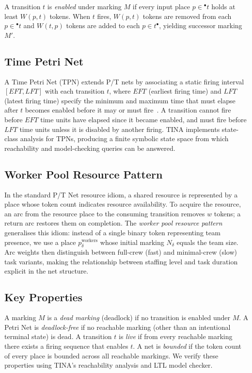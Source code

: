 \documentclass[conference,a4paper]{IEEEtran}
\begin{document}
A transition $t$ is \emph{enabled} under marking $M$ if every input place
$p \in {^\bullet}t$ holds at least $W(p,t)$ tokens. When $t$ fires,
$W(p,t)$ tokens are removed from each $p \in {^\bullet}t$ and $W(t,p)$
tokens are added to each $p \in t^{\bullet}$, yielding successor marking
$M'$.

\subsection{Time Petri Net}

A Time Petri Net (TPN) extends P/T nets by associating a static firing
interval $[\mathit{EFT}, \mathit{LFT}]$ with each transition $t$, where
$\mathit{EFT}$ (earliest firing time) and $\mathit{LFT}$ (latest firing
time) specify the minimum and maximum time that must elapse after $t$ becomes
enabled before it may or must fire~\cite{ref14}. A transition cannot fire
before $\mathit{EFT}$ time units have elapsed since it became enabled, and
must fire before $\mathit{LFT}$ time units unless it is disabled by another
firing. TINA implements state-class analysis for TPNs, producing a finite
symbolic state space from which reachability and model-checking queries can
be answered.

\subsection{Worker Pool Resource Pattern}

In the standard P/T Net resource idiom, a shared resource is represented by
a place whose token count indicates resource availability. To acquire the
resource, an arc from the resource place to the consuming transition removes
$w$ tokens; a return arc restores them on completion. The \emph{worker pool
resource pattern} generalises this idiom: instead of a single binary token
representing team presence, we use a place $p_{\delta}^{\mathrm{workers}}$
whose initial marking $N_{\delta}$ equals the team size. Arc weights then
distinguish between full-crew (fast) and minimal-crew (slow) task variants,
making the relationship between staffing level and task duration explicit in
the net structure.

\subsection{Key Properties}

A marking $M$ is a \emph{dead marking} (deadlock) if no transition is
enabled under $M$. A Petri Net is \emph{deadlock-free} if no reachable
marking (other than an intentional terminal state) is dead. A transition $t$
is \emph{live} if from every reachable marking there exists a firing sequence
that enables $t$. A net is \emph{bounded} if the token count of every place
is bounded across all reachable markings. We verify these properties using
TINA's reachability analysis and LTL model checker.
\end{document}
